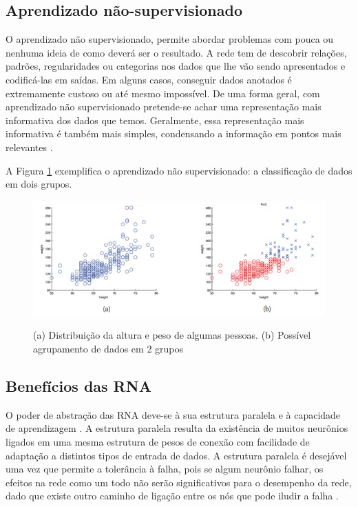 \subsection{Aprendizado não-supervisionado}

O aprendizado não supervisionado, permite abordar problemas com pouca ou nenhuma ideia de como deverá ser o resultado. A rede tem de descobrir relações, padrões, regularidades ou categorias nos dados que lhe vão sendo apresentados e codificá-las em saídas. Em alguns casos, conseguir dados anotados é extremamente custoso ou até mesmo impossível. De uma forma geral, com aprendizado não supervisionado pretende-se achar uma representação mais informativa dos dados que temos. Geralmente, essa representação mais informativa é também mais simples, condensando a informação em pontos mais relevantes \cite{ai}.

A Figura \ref{fig:nao-supervisionado} exemplifica o aprendizado não supervisionado: a classificação de dados em dois grupos.

\begin{figure}[h]
    \caption{(a) Distribuição da altura e peso de algumas pessoas. (b) Possível agrupamento de dados em 2 grupos}
    \centering
    \includegraphics[width=1.0\textwidth]{Textuais/Figuras/nao-supervisionado.png}
    \label{fig:nao-supervisionado}
\end{figure}

\subsection{Benefícios das RNA}

O poder de abstração das RNA deve-se à sua estrutura paralela e à capacidade de aprendizagem \cite{big-data}. A estrutura paralela resulta da existência de muitos neurônios ligados em uma mesma estrutura de pesos de conexão com facilidade de adaptação a distintos tipos de entrada de dados. A estrutura paralela é desejável uma vez que permite a tolerância à falha, pois se algum neurônio falhar, os efeitos na rede como um todo não serão significativos para o desempenho da rede, dado que existe outro caminho de ligação entre os nós que pode iludir a falha \cite{statistical-learning}.

